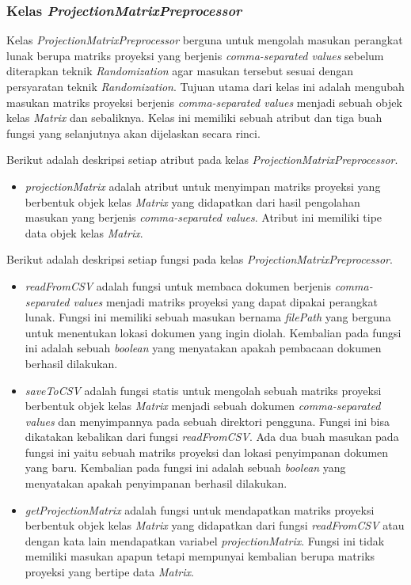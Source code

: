 \subsubsection{Kelas \textit{ProjectionMatrixPreprocessor}}
\label{subsubsec:kelas-projectionpre}

Kelas \textit{ProjectionMatrixPreprocessor} berguna untuk mengolah masukan perangkat lunak berupa matriks proyeksi yang berjenis \textit{comma-separated values} sebelum diterapkan teknik \textit{Randomization} agar masukan tersebut sesuai dengan persyaratan teknik \textit{Randomization}. Tujuan utama dari kelas ini adalah mengubah masukan matriks proyeksi berjenis \textit{comma-separated values} menjadi sebuah objek kelas \textit{Matrix} dan sebaliknya. Kelas ini memiliki sebuah atribut dan tiga buah fungsi yang selanjutnya akan dijelaskan secara rinci.

Berikut adalah deskripsi setiap atribut pada kelas \textit{ProjectionMatrixPreprocessor}.
\begin{itemize}
	\item \textit{projectionMatrix} adalah atribut untuk menyimpan matriks proyeksi yang berbentuk objek kelas \textit{Matrix} yang didapatkan dari hasil pengolahan masukan yang berjenis \textit{comma-separated values}. Atribut ini memiliki tipe data objek kelas \textit{Matrix}.
\end{itemize}

Berikut adalah deskripsi setiap fungsi pada kelas \textit{ProjectionMatrixPreprocessor}.
\begin{itemize}
	\item \textit{readFromCSV} adalah fungsi untuk membaca dokumen berjenis \textit{comma-separated values} menjadi matriks proyeksi yang dapat dipakai perangkat lunak. Fungsi ini memiliki sebuah masukan bernama \textit{filePath} yang berguna untuk menentukan lokasi dokumen yang ingin diolah. Kembalian pada fungsi ini adalah sebuah \textit{boolean} yang menyatakan apakah pembacaan dokumen berhasil dilakukan.
	\item \textit{saveToCSV} adalah fungsi statis untuk mengolah sebuah matriks proyeksi berbentuk objek kelas \textit{Matrix} menjadi sebuah dokumen \textit{comma-separated values} dan menyimpannya pada sebuah direktori pengguna. Fungsi ini bisa dikatakan kebalikan dari fungsi \textit{readFromCSV}. Ada dua buah masukan pada fungsi ini yaitu sebuah matriks proyeksi dan lokasi penyimpanan dokumen yang baru. Kembalian pada fungsi ini adalah sebuah \textit{boolean} yang menyatakan apakah penyimpanan berhasil dilakukan.
	\item \textit{getProjectionMatrix} adalah fungsi untuk mendapatkan matriks proyeksi berbentuk objek kelas \textit{Matrix} yang didapatkan dari fungsi \textit{readFromCSV} atau dengan kata lain mendapatkan variabel \textit{projectionMatrix}. Fungsi ini tidak memiliki masukan apapun tetapi mempunyai kembalian berupa matriks proyeksi yang bertipe data \textit{Matrix}.
\end{itemize}

